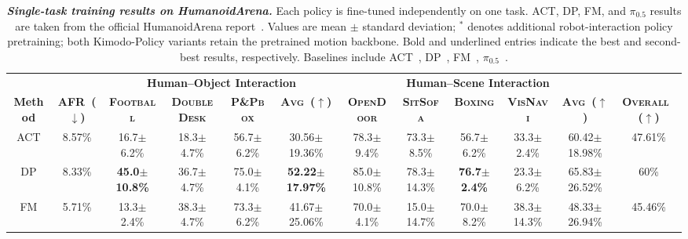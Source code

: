 


  




\begin{table}[H]
  \caption{
    \textbf{\textit{Single-task training results on HumanoidArena.}} Each policy is fine-tuned independently on one task. ACT, DP, FM, and $\pi_{0.5}$ results are taken from the official HumanoidArena report~\citep{humanoidarena}. Values are mean $\pm$ standard deviation; $^{*}$ denotes additional robot-interaction policy pretraining; both Kimodo-Policy variants retain the pretrained motion backbone. Bold and underlined entries indicate the best and second-best results, respectively.
   Baselines include ACT~\citep{ACT}, DP~\citep{chi2023diffusionpolicy}, FM~\citep{FM_objective}, $\pi_{0.5}$~\citep{pi05}.
  }
  \label{tab:arena_single_task}
  \centering
  \begin{adjustbox}{max width=\textwidth}
  \setlength{\tabcolsep}{4.2pt}
  \renewcommand{\arraystretch}{1.08}

  \begin{tabular}{cccccc|cccccc}
  \toprule
  & &
  \multicolumn{4}{c|}{\textbf{Human--Object Interaction}} &
  \multicolumn{5}{c}{\textbf{Human--Scene Interaction}} & \\
  \cmidrule(lr){3-6}
  \cmidrule(lr){7-11}

  \multirow{-2}{*}{\textbf{Method}} &
  \multirow{-2}{*}{\textbf{AFR~($\downarrow$)}} &
  \textbf{\textsc{Football}} &
  \textbf{\textsc{DoubleDesk}} &
  \textbf{\textsc{P\&Pbox}} &
  \textbf{\textsc{Avg~($\uparrow$)}} &
  \textbf{\textsc{OpenDoor}} &
  \textbf{\textsc{SitSofa}} &
  \textbf{\textsc{Boxing}} &
  \textbf{\textsc{VisNavi}} &
  \textbf{\textsc{Avg~($\uparrow$)}} &
  \multirow{-2}{*}{\textbf{\textsc{Overall~($\uparrow$)}}} \\
  
  \midrule
  ACT
  & 8.57\%
  & 16.7$\pm$6.2\%
  & 18.3$\pm$4.7\%
  & 56.7$\pm$6.2\%
  & 30.56$\pm$19.36\%
  & 78.3$\pm$9.4\%
  & 73.3$\pm$8.5\%
  & 56.7$\pm$6.2\%
  & 33.3$\pm$2.4\%
  & 60.42$\pm$18.98\%   & 47.61\% \\

  DP
  & 8.33\%
  & \textbf{45.0$\pm$10.8\%}
  & 36.7$\pm$4.7\%
  & 75.0$\pm$4.1\%
  & \textbf{52.22$\pm$17.97\%}
  & 85.0$\pm$10.8\%
  & 78.3$\pm$14.3\%
  & \textbf{76.7$\pm$2.4\%}
  & 23.3$\pm$6.2\%
  & 65.83$\pm$26.52\%   & 60\% \\

  FM
  & 5.71\%
  & 13.3$\pm$2.4\%
  & 38.3$\pm$4.7\%
  & 73.3$\pm$6.2\%
  & 41.67$\pm$25.06\%
  & 70.0$\pm$4.1\%
  & 15.0$\pm$14.7\%
  & 70.0$\pm$8.2\%
  & 38.3$\pm$14.3\%
  & 48.33$\pm$26.94\%   & 45.46\% \\


\end{tabular}
\end{adjustbox}
\end{table}
